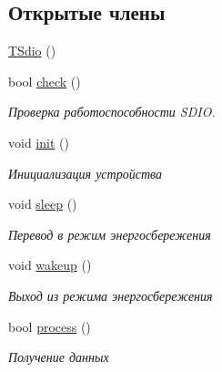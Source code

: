 \subsection*{Открытые члены}
\begin{DoxyCompactItemize}
\item 
\hyperlink{classunit_1_1_t_sdio_ab772a88df605f6d22e9352d281bc7e08}{T\+Sdio} ()
\item 
bool \hyperlink{classunit_1_1_t_sdio_a01d0b69d4bf6735a74efc1a4661289e7}{check} ()
\begin{DoxyCompactList}\small\item\em Проверка работоспособности S\+D\+IO. \end{DoxyCompactList}\item 
\mbox{\label{classunit_1_1_t_sdio_a003c079fd0ca2cf186b17e51fd2c8c56}} 
void \hyperlink{classunit_1_1_t_sdio_a003c079fd0ca2cf186b17e51fd2c8c56}{init} ()
\begin{DoxyCompactList}\small\item\em Инициализация устройства \end{DoxyCompactList}\item 
\mbox{\label{classunit_1_1_t_sdio_ac903a19ed873242ad2da15224b3925fa}} 
void \hyperlink{classunit_1_1_t_sdio_ac903a19ed873242ad2da15224b3925fa}{sleep} ()
\begin{DoxyCompactList}\small\item\em Перевод в режим энергосбережения \end{DoxyCompactList}\item 
\mbox{\label{classunit_1_1_t_sdio_ae2af97f7a50c9bcc53132ab379fd5c25}} 
void \hyperlink{classunit_1_1_t_sdio_ae2af97f7a50c9bcc53132ab379fd5c25}{wakeup} ()
\begin{DoxyCompactList}\small\item\em Выход из режима энергосбережения \end{DoxyCompactList}\item 
\mbox{\label{classunit_1_1_t_sdio_a0ae751c5761bfbafdfa977617a43283b}} 
bool \hyperlink{classunit_1_1_t_sdio_a0ae751c5761bfbafdfa977617a43283b}{process} ()
\begin{DoxyCompactList}\small\item\em Получение данных \end{DoxyCompactList}\end{DoxyCompactItemize}


